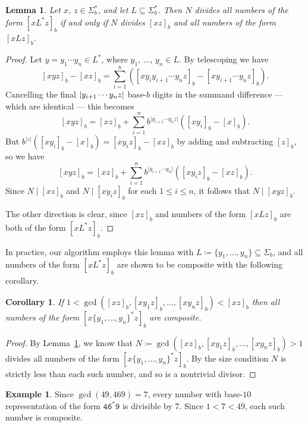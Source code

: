 \documentclass[12pt]{article}
\DeclarePairedDelimiter\abs{\lvert}{\rvert}
\theoremstyle{plain}
\newtheorem{corollary}[theorem]{Corollary}
\newtheorem{lemma}[theorem]{Lemma}
\theoremstyle{definition}
\newtheorem{example}[theorem]{Example}
\newcommand{\0}{\mathtt{0}}
\newcommand{\1}{\mathtt{1}}
\newcommand{\2}{\mathtt{2}}
\newcommand{\3}{\mathtt{3}}
\newcommand{\4}{\mathtt{4}}
\newcommand{\5}{\mathtt{5}}
\newcommand{\6}{\mathtt{6}}
\newcommand{\7}{\mathtt{7}}
\newcommand{\8}{\mathtt{8}}
\newcommand{\9}{\mathtt{9}}
\begin{document}
\begin{lemma}\label{lemone}
Let $x$, $z\in \Sigma^*_b$, and let $L\subseteq\Sigma^*_b$.
Then 
$N$ divides all numbers of the form $[xL^*z]_b$
if and only if 
$N$ divides $[xz]_b$ and all numbers of the form $[xLz]_b$.
\end{lemma}
\begin{proof}%
Let $y=y_1\dotsm y_n\in L^*$, where $y_1$, $\dotsc$, $y_n\in L$.  
By telescoping we have
\[ [xyz]_b - [xz]_b = \sum_{i=1}^{n}([xy_{i}y_{i+1}\dotsm y_n z]_b-[xy_{i+1}\dotsm y_n z]_b) . \]
Cancelling the final $\abs{y_{i+1}\dotsm y_nz}$ base-$b$ digits in the summand difference ---
which are identical --- this becomes
\[ [xyz]_b = [xz]_b + \sum_{i=1}^{n}b^{\lvert{y_{i+1}\dotsm y_n z}\rvert}([xy_i]_b-[x]_b) . \]
But $b^{\lvert z\rvert}([xy_i]_b-[x]_b)=[xy_iz]_b-[xz]_b$ by 
adding and subtracting $[z]_b$, so we have
\[ [xyz]_b = [xz]_b + \sum_{i=1}^{n}b^{\vert{y_{i+1}\dotsm y_n}\rvert}([xy_iz]_b-[xz]_b) . \]
Since $N\mid[xz]_b$ and $N\mid[xy_iz]_b$ for each $1\leq i\leq n$,
 it follows that $N\mid[xyz]_b$.
 
The other direction is clear, since $[xz]_b$ and numbers of the 
form $[xLz]_b$ are both of the form $[xL^*z]_b$.
\end{proof}

In practice, our algorithm employs this lemma with 
$L\coloneqq\{y_1,\dotsc,y_n\}\subseteq\Sigma_b$, and all numbers of the form
$[xL^*z]_b$ are shown to be composite with the following corollary.
\begin{corollary}\label{corone}
If $1<\gcd([xz]_b,[xy_1z]_b,\dotsc,[xy_nz]_b)<[xz]_b$
 then all numbers of the form $[x\{y_1,\dotsc,y_n\}^*z]_b$ are composite.
\end{corollary}
\begin{proof}
By Lemma~\ref{lemone}, we know
that $N\coloneqq\gcd([xz]_b,[xy_1z]_b,\dotsc,[xy_nz]_b)>1$ 
divides all numbers of the form $[x\{y_1,\dotsc,y_n\}^*z]_b$.
By the size condition $N$ is strictly less than each such number, and
so is a nontrivial divisor.
\end{proof}

\begin{example}
Since $\gcd(49, 469)=7$, every number with base-$10$ representation
of the form $\4\6^*\9$ is 
divisible by $7$.
Since $1 < 7 < 49$, each such number is composite.
\end{example}
\end{document}
